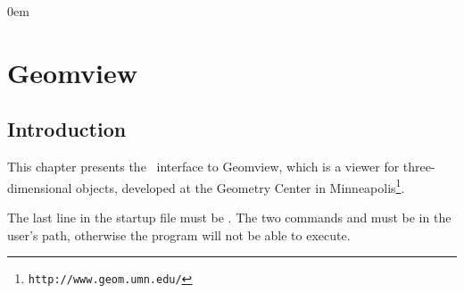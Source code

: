 \newcommand{\Section}[1]{Section~{\protect\ref{#1}}}
\newcommand{\Chapter}[1]{Chapter~{\protect\ref{#1}}}
\newcommand{\new}[1]{\marginpar{\sf #1}}

\newcommand{\what}{\mbox{?\hspace*{2cm}?}}


\parindent0em
\setlength{\parskip}{1ex minus 0.9ex}
\sloppy

\newcommand{\note}[1]{{\bf NOTE: #1}}

\chapter{Geomview} \label{ChapterGeomview}


\section{Introduction}

This chapter presents the \cgal\ interface to Geomview, which is a
viewer for three-dimensional objects, developed at the Geometry Center
in Minneapolis\footnote{\tt http://www.geom.umn.edu/}.

 The last line in the startup file 
must be . The two commands  and 
must be in the user's path, otherwise the program will not be able to execute.

